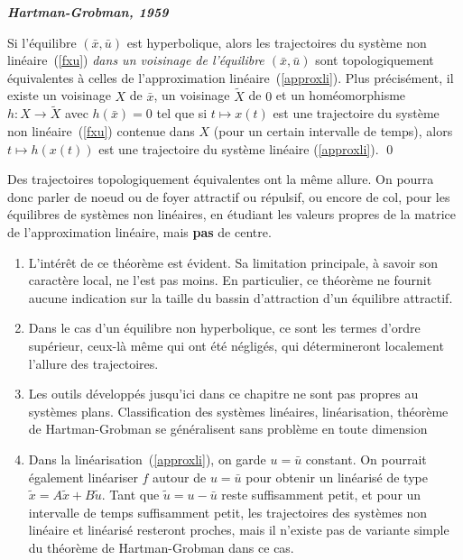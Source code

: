 \begin{theoreme} {\bf{\em Hartman-Grobman, 1959}}

Si l'{é}quilibre $(\bar x,\bar u)$ est hyperbolique, alors les 
trajectoires du syst{è}me non
lin{é}aire~(\ref{fxu})
{\em dans un voisinage de l'{é}quilibre $(\bar x,\bar u)$} sont
topologiquement {é}quivalentes {à} celles  de l'approximation
lin{é}aire~(\ref{approxli}). Plus précisément, il existe un voisinage $X$ de $\bar x$, un voisinage $\tilde{X}$ de $0$ et un homéomorphisme $h: X \to \tilde{X}$ avec $h(\bar x)=0$
tel que si $t \mapsto x(t)$ est une trajectoire du système non 
lin{é}aire~(\ref{fxu}) contenue dans $X$ (pour un certain intervalle de temps), alors $t \mapsto h(x(t))$ est une trajectoire du système linéaire (\ref{approxli}). \label{Hart}\qed
\end{theoreme}

Des trajectoires topologiquement équivalentes ont la m{ê}me allure. On pourra donc parler de noeud ou de foyer attractif ou répulsif, ou encore de
col, pour les {é}quilibres de syst{è}mes non lin{é}aires, en {é}tudiant les valeurs propres de la matrice de l'approximation lin{é}aire, mais {\bf pas} de
centre.

\begin{remarques}\hspace{10mm}\end{remarques}

\begin{enumerate}
\item L'int{é}r{ê}t de ce th{é}or{è}me est {é}vident. Sa limitation
principale, {à} savoir son caract{è}re local, ne l'est pas moins. En
particulier, ce th{é}or{è}me ne fournit aucune indication sur la taille du
bassin d'attraction d'un {é}quilibre attractif.
\item Dans le cas d'un {é}quilibre non hyperbolique, ce sont les termes
d'ordre sup{é}rieur, ceux-l{à} m{ê}me qui ont
{é}t{é} n{é}glig{é}s, qui d{é}termineront localement l'allure des
trajectoires.
\item Les outils développés jusqu'ici dans ce chapitre ne sont pas propres au systèmes plans. Classification des systèmes linéaires, linéarisation, théorème de Hartman-Grobman se généralisent sans problème en toute dimension
\item Dans la linéarisation~(\ref{approxli}), on garde $u=\bar u$ constant. On pourrait également linéariser $f$ autour de $u=\bar u$ pour obtenir un linéarisé de type $\tilde{x}=A\tilde{x} + B\tilde{u}$. Tant que $\tilde{u}=u-\bar u$ reste suffisamment petit, et pour un intervalle de temps suffisamment petit, les trajectoires des systèmes non linéaire et linéarisé resteront proches, mais il n'existe pas de variante simple du théorème de Hartman-Grobman dans ce cas. 
\cqfd
\end{enumerate}



